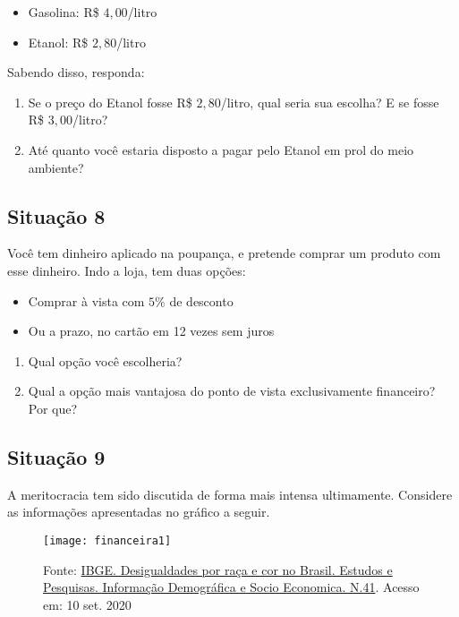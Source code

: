 \begin{itemize}

\item Gasolina: R\$ $4{,}00$/litro 
\item Etanol: R\$ $2{,}80$/litro 

\end{itemize}

Sabendo disso, responda:

\begin{enumerate}
   \item Se o preço do Etanol fosse R\$ $2{,}80$/litro, qual seria sua escolha? E se fosse R\$ $3{,}00$/litro?
   \item Até quanto você estaria disposto a pagar pelo Etanol em prol do meio ambiente?
\end{enumerate}

\subsection{Situação 8}
Você tem dinheiro aplicado na poupança, e pretende comprar um produto com esse dinheiro. Indo a loja, tem duas opções:
\begin{itemize}
\item Comprar à vista com $5\%$ de desconto
\item Ou a prazo, no cartão em 12 vezes sem juros
\end{itemize}

\begin{enumerate}
\item Qual opção você escolheria?
\item Qual a opção mais vantajosa do ponto de vista exclusivamente financeiro? Por que?
\end{enumerate}

\subsection{Situação 9}
A meritocracia tem sido discutida de forma mais intensa ultimamente. Considere as informações apresentadas no gráfico a seguir.

\begin{figure}[H]
\centering

\texttt{[image: financeira1]}
\caption{Fonte: \href{https://biblioteca.ibge.gov.br/visualizacao/livros/liv101681_informativo.pdf}{IBGE. Desigualdades por raça e cor no Brasil. Estudos e Pesquisas. Informação Demográfica e Socio Economica. N.41}. Acesso em: 10 set. 2020}
\end{figure}

